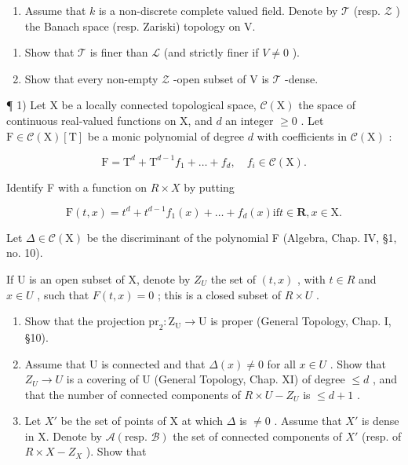 \begin{enumerate}
\def\labelenumi{\arabic{enumi})}
\setcounter{enumi}{3}
\tightlist
\item
  Assume that \(k\) is a non-discrete complete valued field. Denote by \(\mathcal{T}\) (resp. \(\mathcal{Z}\) ) the Banach space (resp. Zariski) topology on V.
\end{enumerate}

\begin{enumerate}
\def\labelenumi{\alph{enumi})}
\item
  Show that \(\mathcal{T}\) is finer than \(\mathcal{L}\) (and strictly finer if \(V \neq 0\) ).
\item
  Show that every non-empty \(\mathcal{Z}\) -open subset of V is \(\mathcal{T}\) -dense.
\end{enumerate}


¶ 1) Let X be a locally connected topological space, \(\mathcal{C}(\mathrm{X})\) the space of continuous real-valued functions on X, and \(d\) an integer \(\geq 0\) . Let \(\mathrm{F} \in \mathcal{C}(\mathrm{X})[\mathrm{T}]\) be a monic polynomial of degree \(d\) with coefficients in \(\mathcal{C}(\mathrm{X})\) :

\[
\mathrm{F} = \mathrm{T} ^ {d} + \mathrm{T} ^ {d - 1} f _ {1} + \dots + f _ {d}, \quad f _ {i} \in \mathcal {C} (\mathrm{X}).
\]

Identify F with a function on \(R \times X\) by putting

\[
\mathrm{F} (t, x) = t ^ {d} + t ^ {d - 1} f _ {1} (x) + \dots + f _ {d} (x) \text {if} t \in \mathbf {R}, x \in \mathrm{X}.
\]

Let \(\Delta \in \mathcal{C}(\mathrm{X})\) be the discriminant of the polynomial F (Algebra, Chap. IV, §1, no. 10).

If U is an open subset of X, denote by \(Z_{U}\) the set of \((t,x)\) , with \(t \in R\) and \(x \in U\) , such that \(F(t,x) = 0\) ; this is a closed subset of \(R \times U\) .

\begin{enumerate}
\def\labelenumi{\alph{enumi})}
\item
  Show that the projection \(\mathrm{pr}_2: \mathrm{Z}_{\mathrm{U}} \to \mathrm{U}\) is proper (General Topology, Chap. I, §10).
\item
  Assume that U is connected and that \(\Delta(x) \neq 0\) for all \(x \in U\) . Show that \(Z_{U} \to U\) is a covering of U (General Topology, Chap. XI) of degree \(\leq d\) , and that the number of connected components of \(R \times U - Z_{U}\) is \(\leq d + 1\) .
\item
  Let \(X'\) be the set of points of X at which \(\Delta\) is \(\neq 0\) . Assume that \(X'\) is dense in X. Denote by \(\mathcal{A}(\text{resp. } \mathcal{B})\) the set of connected components of \(X'\) (resp. of \(R \times X - Z_{X}\) ). Show that
\end{enumerate}

